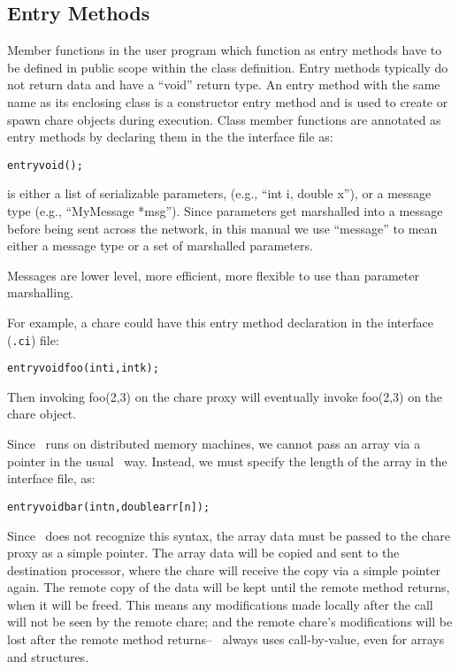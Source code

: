 \subsection{Entry Methods}
\label{entry}

Member functions in the user program which function as entry methods have to be
defined in public scope within the class definition.
Entry methods typically do not return data and have a ``void'' return type.
An entry method with the same name as its enclosing class is a constructor entry method
and is used to create or spawn chare objects during execution.
Class member functions are annotated as entry methods by declaring them in the
the interface file as:
\begin{alltt}
entry void ();
\end{alltt}

 is either a list of serializable parameters, (e.g., ``int i,
double x''), or a message type (e.g., ``MyMessage *msg'').
Since parameters get marshalled into a message before being sent across the
network, in this manual we use ``message'' to mean either a message type or a
set of marshalled parameters.


Messages are lower level, more efficient, more flexible to use than parameter marshalling.

For example, a chare could have this entry method declaration in 
the interface ({\tt .ci}) file:
\begin{alltt}
  entry void foo(int i,int k);
\end{alltt}
Then invoking foo(2,3) on the chare proxy will eventually
invoke foo(2,3) on the chare object.

Since \charmpp\ runs on distributed memory machines, we cannot
pass an array via a pointer in the usual \CC\ way.  Instead,
we must specify the length of the array in the interface file, as:
\begin{alltt}
  entry void bar(int n,double arr[n]);
\end{alltt}
Since \CC\ does not recognize this syntax, the array data
must be passed to the chare proxy as a simple pointer.
The array data will be copied and sent to the
destination processor, where the chare will receive the copy
via a simple pointer again.  The remote copy of the data
will be kept until the remote method returns, when
it will be freed.  
This means any modifications made locally after the call will not be 
seen by the remote chare; and the remote chare's modifications
will be lost after the remote method returns-- \charmpp\ always 
uses call-by-value, even for arrays and structures.  

